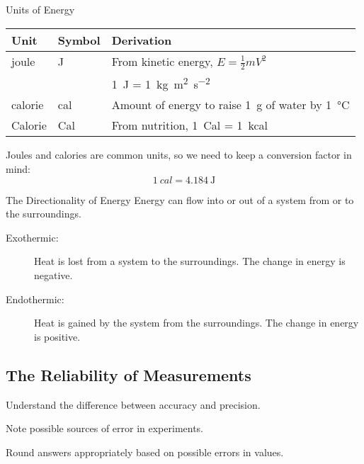\documentclass[notes=show]{beamer}
\begin{document}
\begin{frame}{Units of Energy}
	\begin{center}
		\begin{tabularx}{\linewidth} {l l X}
		\toprule
		\bfseries Unit & \bfseries Symbol & \bfseries Derivation \\
		\midrule
		joule & J & From kinetic energy, $E = \frac{1}{2}mV^2$ \\
		& & \SI{1}{\joule} =
		\SI{1}{\kilo\gram\meter\squared\per\second\squared} \\
		calorie & cal & Amount of energy to raise \SI{1}{\gram} of water
		by \SI{1}{\celsius} \\
		Calorie & Cal & From nutrition, \SI{1}{Cal} =
		\SI{1}{\kilo cal} \\
		\bottomrule
	\end{tabularx}
	\end{center}

	Joules and calories are common units, so we need to keep a
	\alert{conversion factor} in mind:
	\begin{equation*}
		\SI{1}{cal} = \SI{4.184}{\joule}
	\end{equation*}
\end{frame}

\begin{frame}{The Directionality of Energy}
	Energy can flow into or out of a \alert{system} from or to the
	\alert{surroundings}.

	\begin{description}
		\item[Exothermic:] Heat is lost from a system to the
			surroundings. The change in energy is \alert{negative}.
		\item[Endothermic:] Heat is gained by the system from the
			surroundings. The change in energy is
				\alert{positive}.
	\end{description}
\end{frame}

\begin{frame}{}
	\section{The Reliability of Measurements}
	\begin{learningobjectives}
		\item Understand the difference between accuracy and precision.
		\item Note possible sources of error in experiments.
		\item Round answers appropriately based on possible errors in
			values.
	\end{learningobjectives}
\end{frame}
\end{document}
